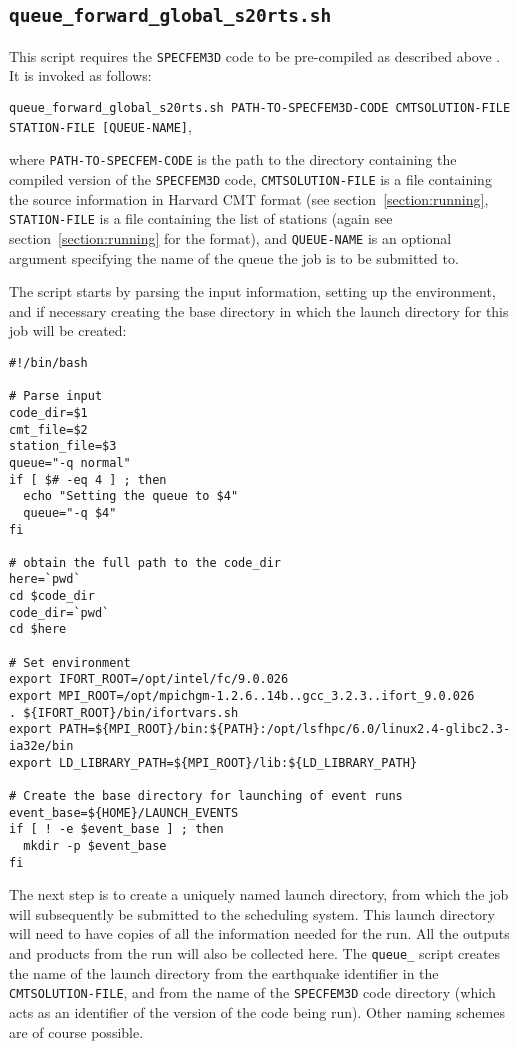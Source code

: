 \documentclass[onecolumn]{article}
\begin{document}
\subsection{\texttt{queue\_forward\_global\_s20rts.sh}}
This script requires the \texttt{SPECFEM3D} code to be pre-compiled as
described above . It is invoked as follows:

\texttt{queue\_forward\_global\_s20rts.sh PATH-TO-SPECFEM3D-CODE
CMTSOLUTION-FILE STATION-FILE [QUEUE-NAME]},

where \texttt{PATH-TO-SPECFEM-CODE} is the path to the directory containing the
compiled version of the \texttt{SPECFEM3D} code,
\texttt{CMTSOLUTION-FILE} is a file containing the source information in
Harvard CMT format (see section~\ref{section:running}, \texttt{STATION-FILE}
is a file containing the list of stations (again see section~\ref{section:running}
for the format), and  \texttt{QUEUE-NAME} is an optional argument specifying
the name of the queue the job is to be submitted to.

The script starts by parsing the input information, setting up the environment,
and if necessary creating the base directory in which the launch directory
for this job will be created:

{\small
\begin{verbatim}
#!/bin/bash

# Parse input
code_dir=$1
cmt_file=$2
station_file=$3
queue="-q normal"
if [ $# -eq 4 ] ; then
  echo "Setting the queue to $4"
  queue="-q $4"
fi

# obtain the full path to the code_dir
here=`pwd`
cd $code_dir
code_dir=`pwd`
cd $here

# Set environment
export IFORT_ROOT=/opt/intel/fc/9.0.026
export MPI_ROOT=/opt/mpichgm-1.2.6..14b..gcc_3.2.3..ifort_9.0.026
. ${IFORT_ROOT}/bin/ifortvars.sh
export PATH=${MPI_ROOT}/bin:${PATH}:/opt/lsfhpc/6.0/linux2.4-glibc2.3-ia32e/bin
export LD_LIBRARY_PATH=${MPI_ROOT}/lib:${LD_LIBRARY_PATH}

# Create the base directory for launching of event runs
event_base=${HOME}/LAUNCH_EVENTS
if [ ! -e $event_base ] ; then
  mkdir -p $event_base
fi

\end{verbatim}}

The next step is to create a uniquely named launch directory, from which the
job will subsequently be submitted to the scheduling system.
This launch directory will need to have copies of all the information needed
for the run.
All the outputs and products from the run will also be collected here.
The \texttt{queue\_} script creates the name of the launch directory from
the earthquake identifier in the \texttt{CMTSOLUTION-FILE},
and from the name of the \texttt{SPECFEM3D} code directory
(which acts as an identifier of the version of the code being run).
Other naming schemes are of course possible.
\end{document}
